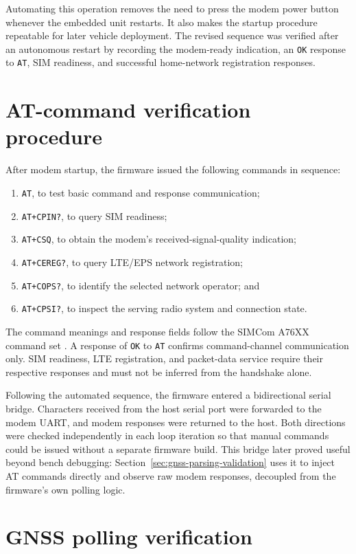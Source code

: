 Automating this operation removes the need to press the modem power button whenever the embedded unit restarts. It also makes the startup procedure repeatable for later vehicle deployment. The revised sequence was verified after an autonomous restart by recording the modem-ready indication, an \texttt{OK} response to \texttt{AT}, SIM readiness, and successful home-network registration responses.

\section{AT-command verification procedure}
\label{sec:at-verification}

After modem startup, the firmware issued the following commands in sequence:
\begin{enumerate}
\item \texttt{AT}, to test basic command and response communication;
\item \texttt{AT+CPIN?}, to query SIM readiness;
\item \texttt{AT+CSQ}, to obtain the modem's received-signal-quality indication;
\item \texttt{AT+CEREG?}, to query LTE/EPS network registration;
\item \texttt{AT+COPS?}, to identify the selected network operator; and
\item \texttt{AT+CPSI?}, to inspect the serving radio system and connection state.
\end{enumerate}

The command meanings and response fields follow the SIMCom A76XX command set \cite{simcoma76xx}. A response of \texttt{OK} to \texttt{AT} confirms command-channel communication only. SIM readiness, LTE registration, and packet-data service require their respective responses and must not be inferred from the handshake alone.

Following the automated sequence, the firmware entered a bidirectional serial bridge. Characters received from the host serial port were forwarded to the modem UART, and modem responses were returned to the host. Both directions were checked independently in each loop iteration so that manual commands could be issued without a separate firmware build. This bridge later proved useful beyond bench debugging: Section~\ref{sec:gnss-parsing-validation} uses it to inject AT commands directly and observe raw modem responses, decoupled from the firmware's own polling logic.

\section{GNSS polling verification}
\label{sec:gnss-polling-verification}

